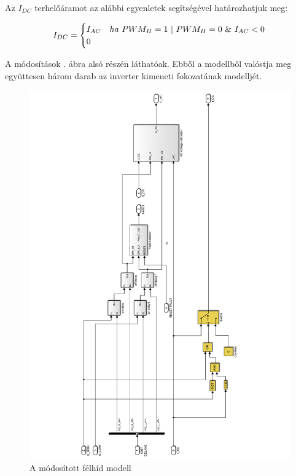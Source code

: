 Az $I_{DC}$ terhelőáramot az alábbi egyenletek segítségével határozhatjuk meg:

\begin{equation}
\centering
I_{DC}
=
\begin{cases}
I_{AC}   & ha \  PWM_H = 1 \  | \  PWM_H = 0 \  \& \  I_{AC} < 0 \\
0 & 
\end{cases}   
\end{equation}

A módosítások . ábra alsó részén láthatóak. Ebből a modellből valóstja meg együttesen három darab az inverter kimeneti fokozatának modelljét. 

\begin{figure}[]
	\centering
	\includegraphics[width = \textwidth]{figures/igbt_model.pdf}
	\caption{A módosított félhíd modell} 
	\label{fig:igbt_model}
\end{figure}




